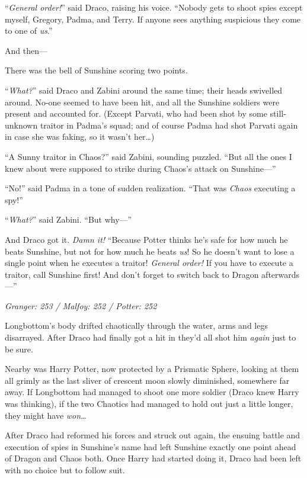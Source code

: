 “\emph{General order!}” said Draco, raising his voice.
“Nobody gets to shoot spies except myself, Gregory, Padma, and Terry. If anyone sees anything suspicious they come to one of \emph{us}.”

And then—

There was the bell of Sunshine scoring two points.

“\emph{What?}” said Draco and Zabini around the same time; their heads swivelled around. No-one seemed to have been hit, and all the Sunshine soldiers were present and accounted for. (Except Parvati, who had been shot by some still-unknown traitor in Padma’s squad; and of course Padma had shot Parvati again in case she was faking, so it wasn’t her…)

“A Sunny traitor in Chaos?” said Zabini, sounding puzzled.
“But all the ones I knew about were supposed to strike during Chaos’s attack on Sunshine—”

“No!” said Padma in a tone of sudden realization.
“That was \emph{Chaos} executing a spy!”

“\emph{What?}” said Zabini.
“But why—”

And Draco got it. \emph{Damn it!}
“Because Potter thinks he’s safe for how much he beats Sunshine, but not for how much he beats \emph{us}! So he doesn’t want to lose a single point when he executes a traitor! \emph{General order!} If you have to execute a traitor, call Sunshine first! And don’t forget to switch back to Dragon afterwards—”

\later

\emph{Granger: 253 / Malfoy: 252 / Potter: 252}

Longbottom’s body drifted chaotically through the water, arms and legs disarrayed. After Draco had finally got a hit in they’d all shot him \emph{again} just to be sure.

Nearby was Harry Potter, now protected by a Prismatic Sphere, looking at them all grimly as the last sliver of crescent moon slowly diminished, somewhere far away. If Longbottom had managed to shoot one more soldier (Draco knew Harry was thinking), if the two Chaotics had managed to hold out just a little longer, they might have \emph{won}…

After Draco had reformed his forces and struck out again, the ensuing battle and execution of spies in Sunshine’s name had left Sunshine exactly one point ahead of Dragon and Chaos both. Once Harry had started doing it, Draco had been left with no choice but to follow suit.

